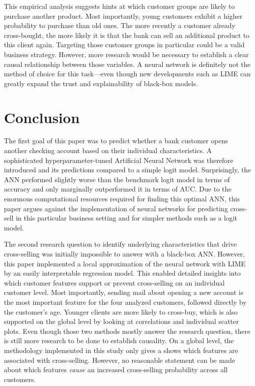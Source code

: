 \documentclass[12pt,a4paper]{article}
\begin{document}
This empirical analysis suggests hints at which customer groups are likely to purchase another product.
Most importantly, young customers exhibit a higher probability to purchase than old ones. The more recently a customer already cross-bought,
the more likely it is that the bank can sell an additional product to this client again.
Targeting those customer groups in particular could be a valid business strategy.
However, more research would be necessary to establish a clear causal relationship between those variables.
A neural network is definitely not the method of choice for this task---even though new developments such as LIME can greatly expand the trust and explainability of black-box models.

\section{Conclusion}

The first goal of this paper was to predict whether a bank customer opens another checking account based on their individual characteristics.
A sophisticated hyperparameter-tuned Artificial Neural Network was therefore introduced and its predictions compared to a simple logit model.
Surprisingly, the ANN performed slightly worse than the benchmark logit model in terms of accuracy and only marginally outperformed it in terms of AUC.
Due to the enormous computational resources required for finding this optimal ANN, this paper argues against the implementation of neural networks
for predicting cross-sell in this particular business setting and for simpler methods such as a logit model.

The second research question to identify underlying characteristics that drive cross-selling was initially impossible to answer with a black-box ANN.
However, this paper implemented a local approximation of the neural network with LIME by an easily interpretable regression model.
This enabled detailed insights into which customer features support or prevent cross-selling on an individual customer level.
Most importantly, sending mail about opening a new account is the most important feature for the four analyzed customers, followed directly by the customer's age.
Younger clients are more likely to cross-buy, which is also supported on the global level by looking at correlations and individual scatter plots.
Even though those two methods mostly answer the research question, there is still more research to be done to establish causality.
On a global level, the methodology implemented in this study only gives a shows which features are associated with cross-selling.
However, no reasonable statement can be made about which features \textit{cause} an increased cross-selling probability across all customers.
\end{document}
